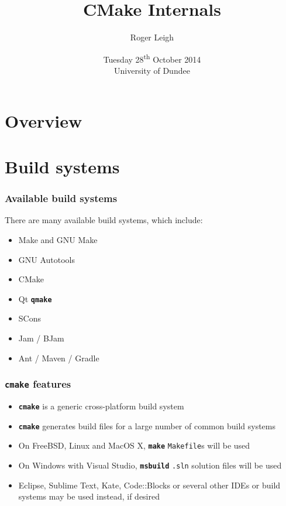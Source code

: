 \documentclass{beamer}
\title{CMake Internals}
\author{Roger Leigh}
\date{Tuesday 28\textsuperscript{th} October 2014\\University of Dundee}
\newcommand{\cmd}[1]{\textbf{\texttt{#1}}}
\begin{document}
\begin{frame}[plain]
  \titlepage
  \begin{center}
     \hfill
    \hfill
  \end{center}
\end{frame}

\section[]{Overview}

\section{Build systems}

\begin{frame}
  \frametitle{Available build systems}
  There are many available build systems, which include:

  \begin{itemize}
  \item Make and GNU Make
  \item GNU Autotools
  \item CMake
  \item Qt \cmd{qmake}
  \item SCons
  \item Jam / BJam
  \item Ant / Maven / Gradle
  \end{itemize}
\end{frame}

\begin{frame}
  \frametitle{\cmd{cmake} features}

  \begin{itemize}
  \item \cmd{cmake} is a generic cross-platform build system
  \item \cmd{cmake} generates build files for a large number of common
    build systems
  \item On FreeBSD, Linux and MacOS X, \cmd{make} \texttt{Makefile}s will be used
  \item On Windows with Visual Studio, \cmd{msbuild} \texttt{.sln}
    solution files will be used
  \item Eclipse, Sublime Text, Kate, Code::Blocks or several other
    IDEs or build systems may be used instead, if desired
  \end{itemize}
\end{frame}
\end{document}
